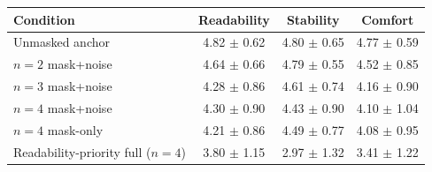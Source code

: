 \begin{tabular}{lccc}
\toprule
Condition & Readability & Stability & Comfort \\
\midrule
Unmasked anchor & 4.82 $\pm$ 0.62 & 4.80 $\pm$ 0.65 & 4.77 $\pm$ 0.59 \\
$n{=}2$ mask+noise & 4.64 $\pm$ 0.66 & 4.79 $\pm$ 0.55 & 4.52 $\pm$ 0.85 \\
$n{=}3$ mask+noise & 4.28 $\pm$ 0.86 & 4.61 $\pm$ 0.74 & 4.16 $\pm$ 0.90 \\
$n{=}4$ mask+noise & 4.30 $\pm$ 0.90 & 4.43 $\pm$ 0.90 & 4.10 $\pm$ 1.04 \\
$n{=}4$ mask-only & 4.21 $\pm$ 0.86 & 4.49 $\pm$ 0.77 & 4.08 $\pm$ 0.95 \\
Readability-priority full ($n{=}4$) & 3.80 $\pm$ 1.15 & 2.97 $\pm$ 1.32 & 3.41 $\pm$ 1.22 \\
\bottomrule
\end{tabular}
